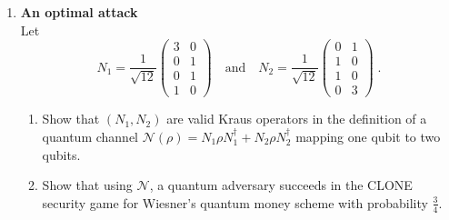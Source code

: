 \documentclass[12pt]{article}
\begin{document}
\begin{enumerate}
		

\item  {\bf An optimal attack}\label{ex:opt-wiesner}\\
Let 
\[ N_1 = \frac{1}{\sqrt{12}} \begin{pmatrix} 3 & 0 \\ 0 & 1 \\ 0 & 1 \\ 1 & 0 \end{pmatrix} \quad \text{and}\quad N_2 = \frac{1}{\sqrt{12}} \begin{pmatrix} 0 & 1 \\ 1 & 0 \\ 1 & 0 \\ 0 & 3\end{pmatrix}\;.\]
\begin{enumerate}
\item Show that $(N_1,N_2)$ are valid Kraus operators in the definition of a quantum channel $\mathcal{N}(\rho)=N_1\rho N_1^\dagger + N_2 \rho N_2^\dagger$ mapping one qubit to two qubits. 
\item Show that using $\mathcal{N}$, a quantum adversary succeeds in the CLONE security game for Wiesner's quantum money scheme with probability $\frac{3}{4}$. 
\end{enumerate}



\end{enumerate}
\end{document}
